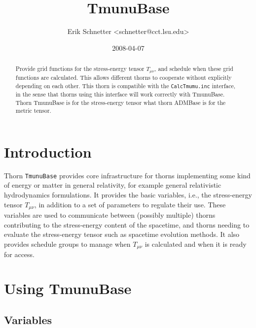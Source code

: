 \documentclass{article}
\begin{document}
\author{Erik Schnetter \textless schnetter@cct.lsu.edu\textgreater}

\title{TmunuBase}

\date{2008-04-07}

\maketitle


\begin{abstract}
  Provide grid functions for the stress-energy tensor $T_{\mu\nu}$,
  and schedule when these grid functions are calculated.  This allows
  different thorns to cooperate without explicitly depending on each
  other.  This thorn is compatible with the \texttt{CalcTmumu.inc}
  interface, in the sense that thorns using this interface will work
  correctly with TmunuBase.  Thorn TmunuBase is for the stress-energy
  tensor what thorn ADMBase is for the metric tensor.
\end{abstract}

\section{Introduction}

Thorn \texttt{TmunuBase} provides core infrastructure for thorns
implementing some kind of energy or matter in general relativity, for
example general relativistic hydrodynamics formulations.  It provides
the basic variables, i.e., the stress-energy tensor $T_{\mu\nu}$, in
addition to a set of parameters to regulate their use.  These
variables are used to communicate between (possibly multiple) thorns
contributing to the stress-energy content of the spacetime, and thorns
needing to evaluate the stress-energy tensor such as spacetime
evolution methods.  It also provides schedule groups to manage when
$T_{\mu\nu}$ is calculated and when it is ready for access.

\section{Using TmunuBase}

\subsection{Variables}
\end{document}
